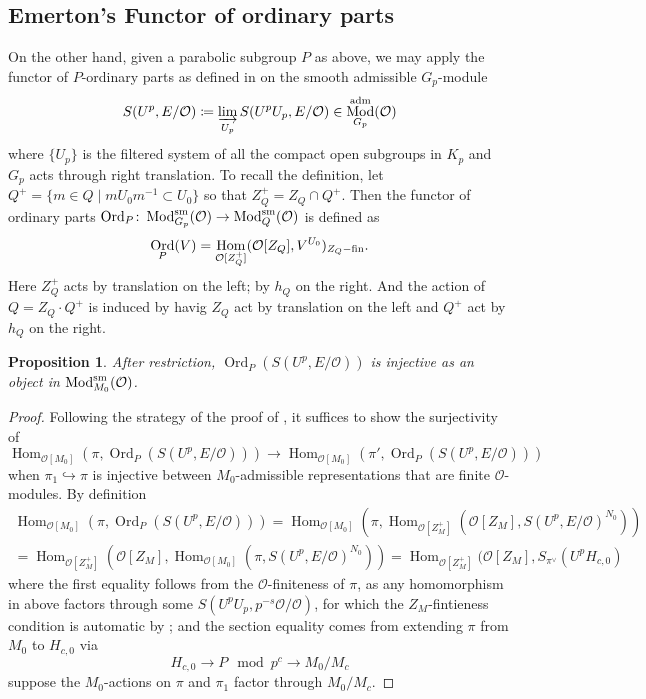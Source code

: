 \documentclass[leqno]{amsart}
\DeclareMathOperator{\Mod}{\textnormal{Mod}}
\DeclareMathOperator{\Ord}{Ord}
\newcommand{\sm}{\textnormal{sm}}
\newcommand{\adm}{\textnormal{adm}}
\newcommand{\fin}{\textnormal{fin}}
\newcommand{\oo}{\mathcal{O}} %
\DeclareMathOperator{\Hom}{Hom}
\newtheorem{prop}[thm]{Proposition}
\theoremstyle{definition}
\theoremstyle{remark}
\begin{document}
\subsection{Emerton's Functor of ordinary parts}

On the other hand,
given a parabolic subgroup $P$ as above, 
we may apply 
the functor of $P$-ordinary parts as defined in \cite{emeI}
on the smooth admissible $G_p$-module
\[
	S(U^p,E/\oo)\coloneqq
	\varinjlim_{U_p}S(U^pU_p,E/\oo)\in 
	\Mod^{\adm}_{G_p}(\oo)
\]
where $\{U_p\}$ is the filtered system of 
all the compact open subgroups in $K_p$
and $G_p$ acts through right translation.
To recall the definition,
let $Q^+=\{m\in Q\mid mU_0m^{-1}\subset U_0\}$ 
so that $Z_Q^+=Z_Q\cap Q^+$.
Then the functor of ordinary parts
$ \Ord_P\colon \Mod^{\sm}_{G_p}(\oo)\to \Mod^{\sm}_Q(\oo)$
is defined as
\[
	\Ord_P(V)=\Hom_{\oo[Z_Q^+]}(\oo[Z_Q], V^{U_0})_{Z_Q-\fin}.
\]
Here $Z_Q^+$ acts by translation on the left; by $h_Q$ on the right.
And the action of $Q=Z_Q\cdot Q^+$ is induced by 
havig $Z_Q$ act by translation on the left and 
$Q^+$ act by $h_Q$ on the right.



\begin{prop}
	After restriction, 
	$\Ord_P(S(U^p,E/\oo))$ is injective
	as an object in $\Mod^{\sm}_{M_0}(\oo)$.
\end{prop}
\begin{proof}
	Following the strategy of the proof of 
	\cite[Prop 3.2.4]{pan}, it suffices to show the surjectivity of
	\[
		\Hom_{\oo[M_0]}(\pi,\Ord_P(S(U^p,E/\oo)))\to 
		\Hom_{\oo[M_0]}(\pi',\Ord_P(S(U^p,E/\oo)))
	\]
	when $\pi_{1}\hookrightarrow \pi$ 
	is injective between $M_0$-admissible
	representations that are finite $\oo$-modules.
	By definition
	\begin{multline*}
		\Hom_{\oo[M_0]}(\pi,\Ord_P(S(U^p,E/\oo)))=
		\Hom_{\oo[M_0]}(\pi,
		\Hom_{\oo[Z_M^+]}
		(\oo[Z_M], S(U^p,E/\oo)^{N_0}))\\=
		\Hom_{\oo[Z_M^+]}(\oo[Z_M],
		\Hom_{\oo[M_0]}(\pi, S(U^p,E/\oo)^{N_0}))=
		\Hom_{\oo[Z_M^+]}(\oo[Z_M],
		S_{\pi^\vee}(U^pH_{c,0})
	\end{multline*}
	where the first equality follows from the $\oo$-finiteness of $\pi$,
	as any homomorphism in above factors through some 
	$S(U^pU_p,p^{-s}\oo/\oo)$,
	for which
	the $Z_M$-fintieness condition is automatic
	by \cite[Lem 3.1.5]{emeI};
	and the section equality comes from 
	extending $\pi$ from  $M_0$ to  $H_{c,0}$ via
	\[
		H_{c,0}\to P \mod p^c\to M_0/M_c
	\]
	suppose the $M_0$-actions on  $\pi$ and  $\pi_1$
	factor through  $M_0/M_c$.
\end{proof}
\end{document}
